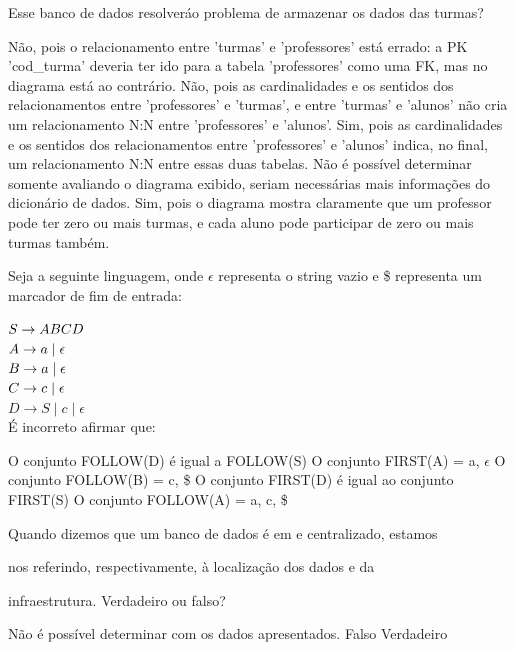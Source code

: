 \documentclass[12pt, addpoints]{exam}
\begin{document}
\begin{questions}
Esse banco de dados resolveráo problema de armazenar os dados das turmas?
\begin{choices}
\choice Não, pois o relacionamento entre 'turmas' e 'professores' está errado: a PK 'cod\_turma' deveria ter ido para a tabela 'professores' como uma FK, mas no diagrama está ao contrário.
\choice Não, pois as cardinalidades e os sentidos dos relacionamentos entre 'professores' e 'turmas', e entre 'turmas' e 'alunos' não cria um relacionamento N:N entre 'professores' e 'alunos'.
\choice Sim, pois as cardinalidades e os sentidos dos relacionamentos entre 'professores' e 'alunos' indica, no final, um relacionamento N:N entre essas duas tabelas.
\choice Não é possível determinar somente avaliando o diagrama exibido, seriam necessárias mais informações do dicionário de dados.
\choice Sim, pois o diagrama mostra claramente que um professor pode ter zero ou mais turmas, e cada aluno pode participar de zero ou mais turmas também.
\end{choices}

\question

Seja a seguinte linguagem, onde \(\epsilon\) representa o string vazio e \$ representa um marcador de fim de entrada:



$S \rightarrow ABCD \\$\\

$A \rightarrow a \mid \epsilon \\$\\

$B \rightarrow a \mid \epsilon \\$\\

$C \rightarrow c \mid \epsilon \\$\\

$D \rightarrow S \mid c \mid \epsilon$\\



É incorreto afirmar que:
\begin{choices}
\choice O conjunto FOLLOW(D) é igual a FOLLOW(S)
\choice O conjunto FIRST(A) = a, \(\epsilon\)
\choice O conjunto FOLLOW(B) = c, \$
\choice O conjunto FIRST(D) é igual ao conjunto FIRST(S)
\choice O conjunto FOLLOW(A) = a, c, \$
\end{choices}

\question

Quando dizemos que um banco de dados é em  e centralizado, estamos

nos referindo, respectivamente, à localização dos dados e da

infraestrutura. Verdadeiro ou falso?
\begin{choices}
\choice Não é possível determinar com os dados apresentados.
\choice Falso
\choice Verdadeiro
\end{choices}



    \end{questions}
    
\end{document}

